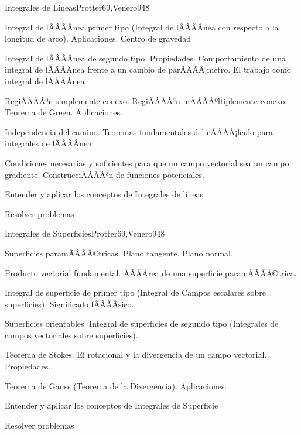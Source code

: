 \begin{sumilla}
\begin{unit}{Integrales de L\'ineas}{Protter69,Venero94}{8}
   \begin{topicos}
	\item  Integral de lÃÂÃÂ­nea primer tipo (Integral de lÃÂÃÂ­nea con respecto a la longitud de arco). Aplicaciones. Centro de gravedad
	\item  Integral de lÃÂÃÂ­nea de segundo tipo. Propiedades. Comportamiento de una integral de lÃÂÃÂ­nea frente a un cambio de parÃÂÃÂ¡metro. El trabajo como integral de lÃÂÃÂ­nea
	\item  RegiÃÂÃÂ³n simplemente conexo. RegiÃÂÃÂ³n mÃÂÃÂºltiplemente conexo. Teorema de Green. Aplicaciones.
	\item  Independencia del camino. Teoremas fundamentales del cÃÂÃÂ¡lculo para integrales de lÃÂÃÂ­nea.
	\item Condiciones necesarias y suficientes para que un campo vectorial sea un campo gradiente. ConstrucciÃÂÃÂ³n de funciones potenciales.
   \end{topicos}

   \begin{objetivos}
         \item  Entender y aplicar los conceptos de Integrales de l\'ineas
         \item  Resolver problemas
   \end{objetivos}
\end{unit}

\begin{unit}{Integrales de Superficies}{Protter69,Venero94}{8}
   \begin{topicos}
         \item  Superficies paramÃÂÃÂ©tricas. Plano tangente. Plano normal.
	 \item  Producto vectorial fundamental. ÃÂÃÂrea de una superficie paramÃÂÃÂ©trica.
         \item  Integral de superficie de primer tipo (Integral de Campos escalares sobre superficies). Significado fÃÂÃÂ­sico.
	 \item  Superficies orientables. Integral de superficies de segundo tipo (Integrales de campos vectoriales sobre superficies).
         \item  Teorema de Stokes. El rotacional y la divergencia de un campo vectorial. Propiedades.
         \item  Teorema de Gauss (Teorema de la Divergencia). Aplicaciones.
   \end{topicos}

   \begin{objetivos}
         \item  Entender y aplicar los conceptos de Integrales de Superficie
         \item  Resolver problemas
   \end{objetivos}
\end{unit}

\begin{bibliografia}
\end{bibliografia}

\end{sumilla}


